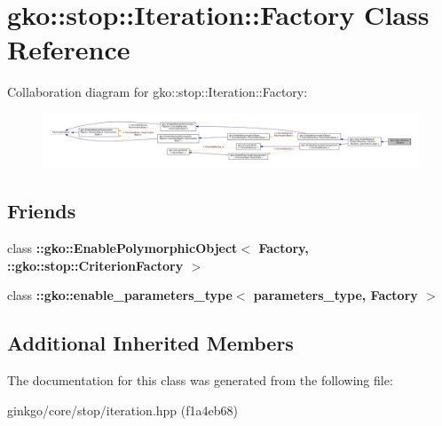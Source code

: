 \hypertarget{classgko_1_1stop_1_1Iteration_1_1Factory}{}\section{gko\+:\+:stop\+:\+:Iteration\+:\+:Factory Class Reference}
\label{classgko_1_1stop_1_1Iteration_1_1Factory}


Collaboration diagram for gko\+:\+:stop\+:\+:Iteration\+:\+:Factory\+:
\nopagebreak
\begin{figure}[H]
\begin{center}
\leavevmode
\includegraphics[width=350pt]{classgko_1_1stop_1_1Iteration_1_1Factory__coll__graph}
\end{center}
\end{figure}
\subsection*{Friends}
\begin{DoxyCompactItemize}
\item 
\mbox{\label{classgko_1_1stop_1_1Iteration_1_1Factory_aaa5507cf00e5361a77971746fefa42e6}} 
class {\bfseries \+::gko\+::\+Enable\+Polymorphic\+Object$<$ Factory, \+::gko\+::stop\+::\+Criterion\+Factory $>$}
\item 
\mbox{\label{classgko_1_1stop_1_1Iteration_1_1Factory_a0d176cbd42d6214e11aee8c30ca256fc}} 
class {\bfseries \+::gko\+::enable\+\_\+parameters\+\_\+type$<$ parameters\+\_\+type, Factory $>$}
\end{DoxyCompactItemize}
\subsection*{Additional Inherited Members}


The documentation for this class was generated from the following file\+:\begin{DoxyCompactItemize}
\item 
ginkgo/core/stop/iteration.\+hpp (f1a4eb68)\end{DoxyCompactItemize}
